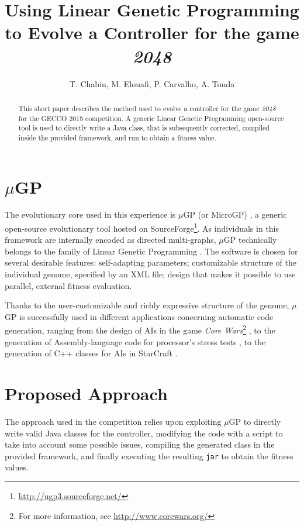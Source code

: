 \documentclass[]{article}
\title{Using Linear Genetic Programming\\to Evolve a Controller for the game \emph{2048}}
\author{T. Chabin, M. Elouafi, P. Carvalho, A. Tonda}
\begin{document}
\maketitle

\begin{abstract}
This short paper describes the method used to evolve a controller for the game \emph{2048} for the GECCO 2015 competition. A generic Linear Genetic Programming open-source tool is used to directly write a Java class, that is subsequently corrected, compiled inside the provided framework, and run to obtain a fitness value.
\end{abstract}

\section{$\mu$GP}
The evolutionary core used in this experience is $\mu$GP (or MicroGP) \cite{Squillero2005}, a generic open-source evolutionary tool hosted on SourceForge\footnote{\url{http://ugp3.sourceforge.net/}}. As individuals in this framework are internally encoded as directed multi-graphs, $\mu$GP technically belongs to the family of Linear Genetic Programming \cite{}. The software is chosen for several desirable features: self-adapting parameters; customizable structure of the individual genome, specified by an XML file; design that makes it possible to use parallel, external fitness evaluation.

Thanks to the user-customizable and richly expressive structure of the genome, $\mu$GP is successfully used in different applications concerning automatic code generation, ranging from the design of AIs in the game \emph{Core Wars}\footnote{For more information, see \url{http://www.corewars.org/}} \cite{Corno2005}, to the generation of Assembly-language code for processor's stress tests \cite{Corno2003}, %
to the generation of C++ classes for AIs in StarCraft \cite{Garcia2015}.

\section{Proposed Approach}
The approach used in the competition relies upon exploiting $\mu$GP to directly write valid Java classes for the controller, modifying the code with a script to take into account some possible issues, compiling the generated class in the provided framework, and finally executing the resulting \texttt{jar} to obtain the fitness values.
\end{document}

